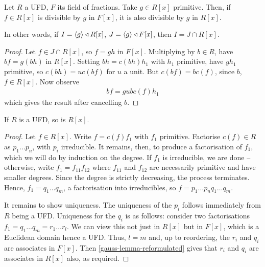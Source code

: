 \documentclass{../template/note}
\begin{document}
    \begin{proposition}
        \label{gauss-lemma-reformulated}
        Let $R$ a UFD, $F$ its field of fractions. Take $g \in R[x]$ primitive. Then, if $f \in R[x]$ is divisible by $g$ in $F[x]$, it is also divisible by $g$ in $R[x]$.

        In other words, if $I = \left \langle g \right \rangle \triangleleft R[x]$, $J = \left \langle g \right \rangle \triangleleft F[x]$, then $I = J \cap R[x]$.
    \end{proposition}
    
    \begin{proof}
        Let $f \in J \cap R[x]$, so $f = gh$ in $F[x]$. Multiplying by $b \in R$, have $bf = g(bh)$ in $R[x]$. Setting $bh = c(bh)h_1$ with $h_1$ primitive, have $gh_1$ primitive, so $c(bh) = uc(bf)$ for $u$ a unit. But $c(bf) = bc(f)$, since $b$, $f \in R[x]$. Now observe
        \begin{align*}
            bf = gubc(f)h_1
        \end{align*}
        which gives the result after cancelling $b$.        
    \end{proof}
    
    \begin{theorem}
        If $R$ is a UFD, so is $R[x]$.
    \end{theorem}
    
    \begin{proof}
        Let $f \in R[x]$. Write $f = c(f)f_1$ with $f_1$ primitive. Factorise $c(f) \in R$ as $p_1 \dots p_n$, with $p_i$ irreducible. It remains, then, to produce a factorisation of $f_1$, which we will do by induction on the degree. If $f_1$ is irreducible, we are done -- otherwise, write $f_1 = f_{11}f_{12}$ where $f_{11}$ and $f_{12}$ are necessarily primitive and have smaller degrees. Since the degree is strictly decreasing, the process terminates. Hence, $f_1 = q_1 \dots q_m$, a factorisation into irreducibles, so $f = p_1 \dots p_n q_1 \dots q_m$.

        It remains to show uniqueness. The uniqueness of the $p_i$ follows immediately from $R$ being a UFD. Uniqueness for the $q_i$ is as follows: consider two factorisations $f_1 = q_1 \dots q_m = r_1 \dots r_l$. We can view this not just in $R[x]$ but in $F[x]$, which is a Euclidean domain hence a UFD. Thus, $l=m$ and, up to reordering, the $r_i$ and $q_i$ are associates in $F[x]$. Then \cref{gauss-lemma-reformulated} gives that $r_i$ and $q_i$ are associates in $R[x]$ also, as required.
    \end{proof}
    
\end{document}
